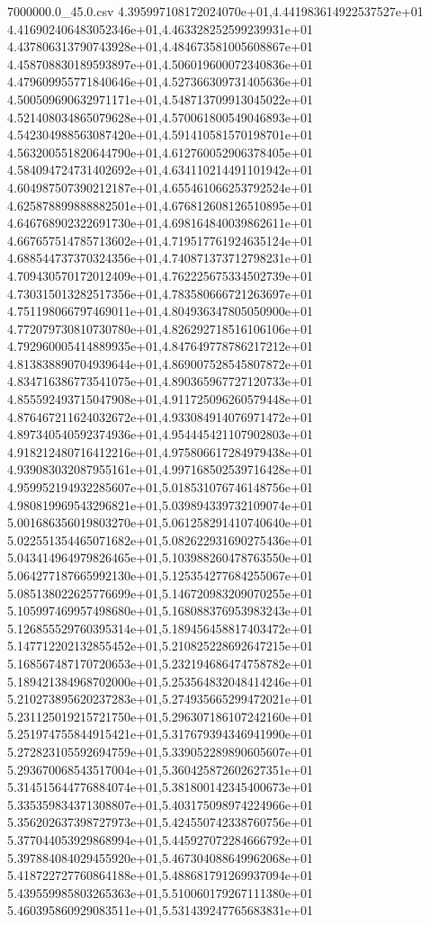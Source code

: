 \begin{filecontents*}{7000000.0_45.0.csv}
4.395997108172024070e+01,4.441983614922537527e+01
4.416902406483052346e+01,4.463328252599239931e+01
4.437806313790743928e+01,4.484673581005608867e+01
4.458708830189593897e+01,4.506019600072340836e+01
4.479609955771840646e+01,4.527366309731405636e+01
4.500509690632971171e+01,4.548713709913045022e+01
4.521408034865079628e+01,4.570061800549046893e+01
4.542304988563087420e+01,4.591410581570198701e+01
4.563200551820644790e+01,4.612760052906378405e+01
4.584094724731402692e+01,4.634110214491101942e+01
4.604987507390212187e+01,4.655461066253792524e+01
4.625878899888882501e+01,4.676812608126510895e+01
4.646768902322691730e+01,4.698164840039862611e+01
4.667657514785713602e+01,4.719517761924635124e+01
4.688544737370324356e+01,4.740871373712798231e+01
4.709430570172012409e+01,4.762225675334502739e+01
4.730315013282517356e+01,4.783580666721263697e+01
4.751198066797469011e+01,4.804936347805050900e+01
4.772079730810730780e+01,4.826292718516106106e+01
4.792960005414889935e+01,4.847649778786217212e+01
4.813838890704939644e+01,4.869007528545807872e+01
4.834716386773541075e+01,4.890365967727120733e+01
4.855592493715047908e+01,4.911725096260579448e+01
4.876467211624032672e+01,4.933084914076971472e+01
4.897340540592374936e+01,4.954445421107902803e+01
4.918212480716412216e+01,4.975806617284979438e+01
4.939083032087955161e+01,4.997168502539716428e+01
4.959952194932285607e+01,5.018531076746148756e+01
4.980819969543296821e+01,5.039894339732109074e+01
5.001686356019803270e+01,5.061258291410740640e+01
5.022551354465071682e+01,5.082622931690275436e+01
5.043414964979826465e+01,5.103988260478763550e+01
5.064277187665992130e+01,5.125354277684255067e+01
5.085138022625776699e+01,5.146720983209070255e+01
5.105997469957498680e+01,5.168088376953983243e+01
5.126855529760395314e+01,5.189456458817403472e+01
5.147712202132855452e+01,5.210825228692647215e+01
5.168567487170720653e+01,5.232194686474758782e+01
5.189421384968702000e+01,5.253564832048414246e+01
5.210273895620237283e+01,5.274935665299472021e+01
5.231125019215721750e+01,5.296307186107242160e+01
5.251974755844915421e+01,5.317679394346941990e+01
5.272823105592694759e+01,5.339052289890605607e+01
5.293670068543517004e+01,5.360425872602627351e+01
5.314515644776884074e+01,5.381800142345400673e+01
5.335359834371308807e+01,5.403175098974224966e+01
5.356202637398727973e+01,5.424550742338760756e+01
5.377044053929868994e+01,5.445927072284666792e+01
5.397884084029455920e+01,5.467304088649962068e+01
5.418722727760864188e+01,5.488681791269937094e+01
5.439559985803265363e+01,5.510060179267111380e+01
5.460395860929083511e+01,5.531439247765683831e+01

\end{filecontents*}
